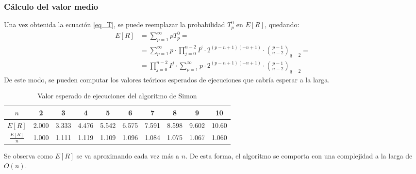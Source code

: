 \subsubsection{Cálculo del valor medio}
Una vez obtenida la ecuación \eqref{eq_T}, se puede reemplazar la probabilidad 
$T_p^0$ en $E[R]$, quedando:
%
\begin{equation}
\begin{split}
	E[R] &= \sum_{p=1}^\infty p T^0_p =\\
	&= \sum_{p=1}^\infty p \cdot \prod^{n-2}_{j=0} I^j \cdot 2^{(p-n+1)(-n+1)} 
\cdot {p-1 \choose n-2}_{q=2} = \\
	&= \prod^{n-2}_{j=0} I^j \cdot \sum_{p=1}^\infty p \cdot 2^{(p-n+1)(-n+1)} 
\cdot {p-1 \choose n-2}_{q=2}
\end{split}
\end{equation}
%
De este modo, se pueden computar los valores teóricos esperados de ejecuciones 
que cabría esperar a la larga.
\begin{table}[h]
	\begin{tabular}{|c|*{9}{|c}|}
		\hline
		$n$      & 2 & 3 & 4 & 5 & 6 & 7 & 8 & 9 & 10\\ \hline
		$E[R]$   &
2.000& 3.333& 4.476& 5.542& 6.575& 7.591& 8.598& 9.602& 10.60
\\
		$\frac{E[R]}{n}$ &
1.000& 1.111& 1.119& 1.109& 1.096& 1.084& 1.075& 1.067& 1.060\\
		\hline
	\end{tabular}
\caption{Valor esperado de ejecuciones del algoritmo de Simon}
\label{tabla_E}
\end{table}
%

Se observa como $E[R]$ se va aproximando cada vez más a $n$. De esta forma, el 
algoritmo se comporta con una complejidad a la larga de $O(n)$.
